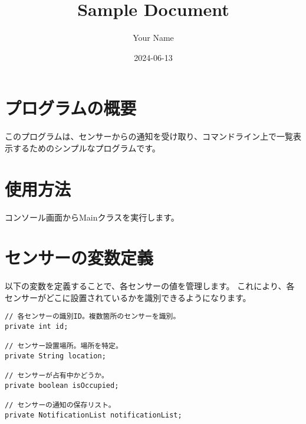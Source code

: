 \documentclass[11pt]{article}
\author{Your Name}
\date{2024-06-13}
\title{Sample Document}
\begin{document}
\maketitle
\tableofcontents


\section{プログラムの概要}
\label{sec:org6e78cf8}
このプログラムは、センサーからの通知を受け取り、コマンドライン上で一覧表示するためのシンプルなプログラムです。

\section{使用方法}
\label{sec:org764c90e}
コンソール画面からMainクラスを実行します。

\section{センサーの変数定義}
\label{sec:orgb50deef}
以下の変数を定義することで、各センサーの値を管理します。
これにより、各センサーがどこに設置されているかを識別できるようになります。

\begin{verbatim}
// 各センサーの識別ID。複数箇所のセンサーを識別。
private int id;

// センサー設置場所。場所を特定。
private String location;

// センサーが占有中かどうか。
private boolean isOccupied;

// センサーの通知の保存リスト。
private NotificationList notificationList;
\end{verbatim}
\end{document}
